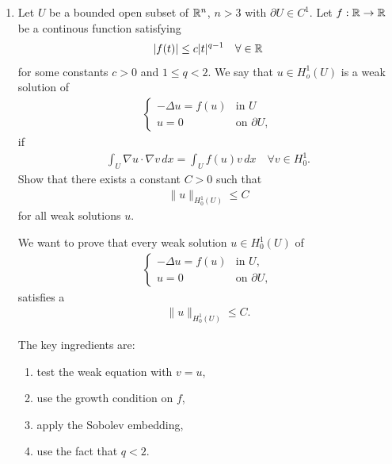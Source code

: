 \documentclass[12pt,a4paper]{report}
\begin{document}
\begin{enumerate}
If you'd like, I can show why the assumption that $(u_j)$ is bounded in $H_0^1(U)$ is actually automatic from the boundedness of $(f_j$) in $L^2(U)$.

\HLINE

\textbf{Questions}
\begin{itemize}
	\item \textit{Explain `weak convergence'}
	\item \textit{Explain `weak differeentiation'}
	\item \textit{Explain the reltionship between $H_0^1$ and $L^p$ spaces}
\end{itemize}


\newpage
\item Let $U$ be a bounded open subset of $\mathbb{R}^n$, $n>3$ with $\partial U \in C^1$.  Let $f: \mathbb{R}\to\mathbb{R}$ be a continous function satisfying
\begin{align*}
	|f(t)| \le c|t|^{q-1}\quad\forall \in \mathbb{R}
\end{align*}
for some constants $c > 0$ and $ 1 \le q < 2$.  We say that $u \in H_o^1(U)$ is a weak solution of 
\begin{align*}
	\left \{\begin{array}{rl}
		 -\Delta u=f(u) & \text{in } U\\
		u = 0 & \text{on } \partial U,
	\end{array} \right .
\end{align*}
if
\begin{align*}
	\int_U \nabla u\cdot\nabla v\, dx = \int_U f(u)v\,dx\quad \forall v \in H_0^1.
\end{align*}
Show that there exists a constant $C >0$ such that 
\begin{align*}
	\|u\|_{H_0^1(U)} \le C
\end{align*}
for all weak solutions $u$.

\HLINE

We want to prove that every weak solution $u\in H_0^1(U)$ of
\begin{align*}
\begin{cases}
-\Delta u=f(u) &\text{in }U,\\
u=0 &\text{on }\partial U,
\end{cases}
\end{align*}
satisfies a 
\begin{align*}
\|u\|_{H_0^1(U)}\le C.
\end{align*}

The key ingredients are:
\begin{enumerate}
\item test the weak equation with $v=u$,
\item use the growth condition on $f$,
\item apply the Sobolev embedding,
\item use the fact that $q<2$.
\end{enumerate}


\end{enumerate}
\end{document}
